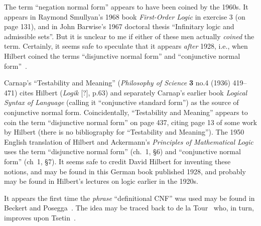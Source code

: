 \begin{node}
\begin{node}[History]\label{prop:normal-form-000N}%
\begin{node}\label{prop-normal-form-0003}%
The term ``negation normal form'' appears to have been coined by the
1960s. It appears in Raymond Smullyan's 1968 book \textit{First-Order Logic}
in exercise 3 (on page 131), and in John Barwise's 1967 doctoral thesis
``Infinitary logic and admissible sets''. But it is unclear to me if
either of these men actually \emph{coined} the term. Certainly, it seems
safe to speculate that it appears \emph{after} 1928, i.e., when Hilbert
coined the terms ``disjunctive normal form'' and ``conjunctive normal form''~.
\end{node}

\begin{node}\label{prop-normal-form-0004}%
Carnap's ``Testability and Meaning'' (\textit{Philosophy of Science}
\textbf{3} no.4 (1936) 419--471) cites Hilbert (\textit{Logik} [?],
p.63) and separately Carnap's earlier book \textit{Logical Syntax of Language}
(calling it  ``conjunctive standard form'') as the source of conjunctive
normal form. Coincidentally, ``Testability and Meaning'' appears to coin
the term ``disjunctive normal form'' on page 437, citing page 13 of some work by Hilbert (there is no bibliography for ``Testability and Meaning'').
The 1950 English translation of Hilbert and Ackermann's
\textit{Principles of Mathematical Logic} uses the term ``disjunctive
normal form'' (ch.~1, \S6) and ``conjunctive normal form'' (ch~1, \S7).
It seems safe to credit David Hilbert for inventing these notions, and
may be found in this German book published 1928, and probably may be
found in Hilbert's lectures on logic earlier in the 1920s.
\end{node}

\begin{node}\label{prop-000X}%
It appears the first time the \emph{phrase} ``definitional CNF'' was
used may be found in Beckert and Posegga~\cite{beckert1994lean}. The
idea may be traced back to de la Tour~\cite{de1990minimizing} who, in
turn, improves upon Tsetin~\cite{Tseitin1983}.
\end{node}
\end{node}
\end{node}
